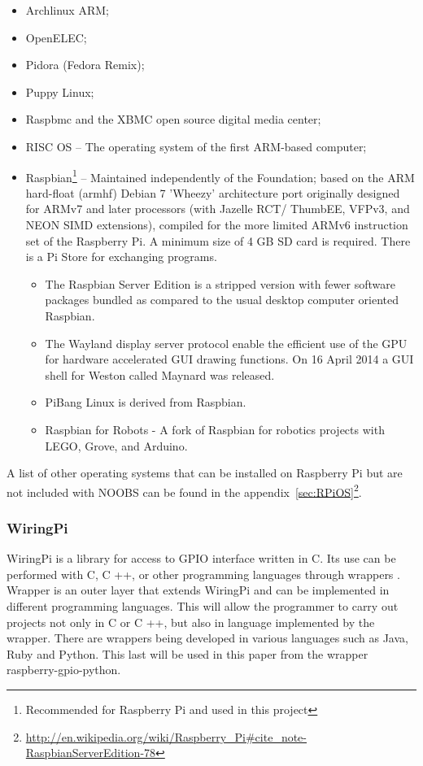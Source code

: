 \documentclass{acm_proc_article-sp}
\begin{document}
\begin{itemize}

\item Archlinux ARM;
\item OpenELEC;
\item Pidora (Fedora Remix);
\item Puppy Linux;
\item Raspbmc and the XBMC open source digital media center;
\item RISC OS – The operating system of the first ARM-based computer;
\item Raspbian\footnote{Recommended for Raspberry Pi and used in this project} \cite{Raspbian} – Maintained independently of the Foundation; based on the ARM hard-float (armhf) Debian 7 'Wheezy' architecture port originally designed for ARMv7 and later processors (with Jazelle RCT/ ThumbEE, VFPv3, and NEON SIMD extensions), compiled for the more limited ARMv6 instruction set of the Raspberry Pi. A minimum size of 4 GB SD card is required. There is a Pi Store for exchanging programs\cite{PiStore}.
\begin{itemize}
\item The Raspbian Server Edition is a stripped version with fewer software packages bundled as compared to the usual desktop computer oriented Raspbian\cite{Yau,Raspbianwheezy}.
\item The Wayland display server protocol enable the efficient use of the GPU for hardware accelerated GUI drawing functions\cite{EbenUpton}. On 16 April 2014 a GUI shell for Weston called Maynard was released.
\item PiBang Linux is derived from Raspbian\cite{Pibanglinux}.
\item Raspbian for Robots\cite{DexterIndustries} - A fork of Raspbian for robotics projects with LEGO, Grove, and Arduino.
\end{itemize}

\end{itemize}

A list of other operating systems that can be installed on Raspberry Pi but are not included with NOOBS can be found in the appendix~\ref{sec:RPiOS}\footnote{\url{http://en.wikipedia.org/wiki/Raspberry_Pi\#cite_note-RaspbianServerEdition-78}}.


\subsubsection{WiringPi}
WiringPi is a library for access to GPIO interface written in C. Its use can be performed with C, C ++, or other programming languages through wrappers \cite{wiring}. Wrapper is an outer layer that extends WiringPi and can be implemented in different programming languages. This will allow the programmer to carry out projects not only in C or C ++, but also in language implemented by the wrapper. There are wrappers being developed in various languages such as Java, Ruby and Python. This last will be used in this paper from the wrapper raspberry-gpio-python.
\end{document}
